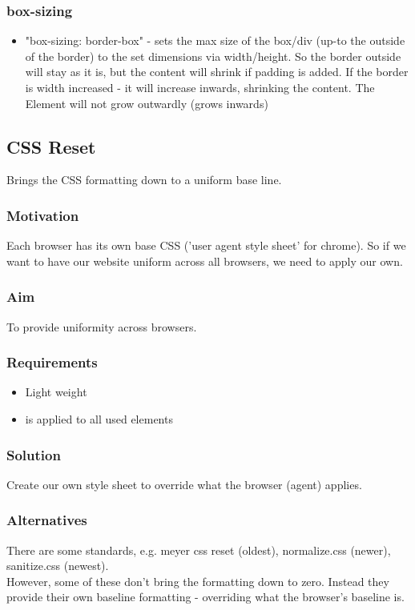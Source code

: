\documentclass[]{article}
\begin{document}
\subsubsection{box-sizing}
\begin{itemize}
	\item "box-sizing: border-box" - sets the max size of the box/div (up-to the outside of the border) to the set dimensions via width/height.  So the border outside will stay as it is, but the content will shrink if padding is added.  If the border is width increased - it will increase inwards, shrinking the content.  The Element will not grow outwardly (grows inwards) 
\end{itemize}

\subsection{CSS Reset}
Brings the CSS formatting down to a uniform base line.
\subsubsection{Motivation}
Each browser has its own base CSS ('user agent style sheet'  for chrome).  So if we want to have our website uniform across all browsers, we need to apply our own.
\subsubsection{Aim}
To provide uniformity across browsers.
\subsubsection{Requirements}
\begin{itemize}
	\item Light weight
	\item is applied to all used elements
\end{itemize}
\subsubsection{Solution}
Create our own style sheet to override what the browser (agent) applies.
\subsubsection{Alternatives}
There are some standards, e.g. meyer css reset (oldest), normalize.css (newer), sanitize.css (newest).  
\\
However, some of these don't bring the formatting down to zero.  Instead they provide their own baseline formatting - overriding what the browser's baseline is.
\end{document}

